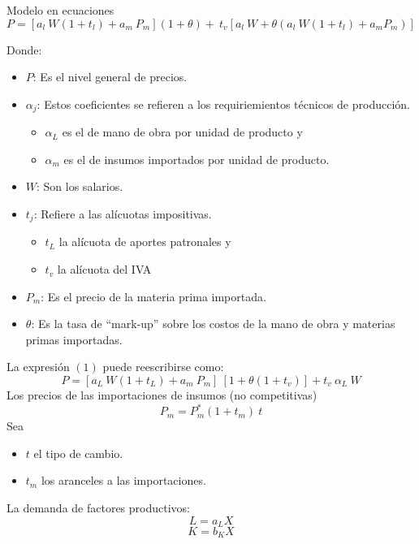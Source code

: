 \documentclass[
  ignorenonframetext,
]{beamer}
\providecommand{\tightlist}{%
  \setlength{\itemsep}{0pt}\setlength{\parskip}{0pt}}\usepackage{longtable,booktabs,array}
\begin{document}
\begin{frame}{Modelo en ecuaciones}
\label{modelo-en-ecuaciones}
\[
P=[a_l\ W (1+t_l)+a_m\ P_m](1+\theta)+\ t_v[a_l\ W +\theta(a_l\ W(1+t_l)+a_mP_m)]
\tag{1}
\]

Donde:

\begin{itemize}
\item
  \(P\): Es el nivel general de precios.
\item
  \(\alpha_j\): Estos coeficientes se refieren a los requiriemientos
  técnicos de producción.

  \begin{itemize}
  \item
    \(\alpha_L\) es el de mano de obra por unidad de producto y
  \item
    \(\alpha_m\) es el de insumos importados por unidad de producto.
  \end{itemize}
\item
  \(W\): Son los salarios.
\item
  \(t_j\): Refiere a las alícuotas impositivas.

  \begin{itemize}
  \item
    \(t_L\) la alícuota de aportes patronales y
  \item
    \(t_v\) la alícuota del IVA
  \end{itemize}
\item
  \(P_m\): Es el precio de la materia prima importada.
\item
  \(\theta\): Es la tasa de ``mark-up'' sobre los costos de la mano de
  obra y materias primas importadas.
\end{itemize}
\end{frame}

\begin{frame}{}
\label{section}
La expresión \((1)\) puede reescribirse como: \[
P=[a_L\ W (1+t_L)+a_m\ P_m]\ [1+\theta (1+t_v)]+ t_v\ \alpha_L\ W
\tag{1'}
\] Los precios de las importaciones de insumos (no competitivas)
\[ P_m=P^*_m(1+t_m)\ t \tag{2}
\] Sea

\begin{itemize}
\tightlist
\item
  \(t\) el tipo de cambio.
\item
  \(t_m\) los aranceles a las importaciones.
\end{itemize}

\hfill\break
La demanda de factores productivos: \[
L=a_L X
\tag{3}
\] \[
K=b_K X
\tag{4}
\]
\end{frame}
\end{document}
